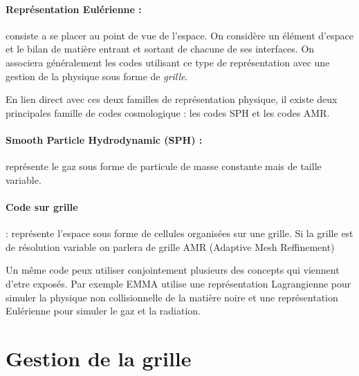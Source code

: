 \paragraph{Représentation Eulérienne : } 
consiste a se placer au point de vue de l'espace.
On considère un élément d'espace et le bilan de matière entrant et sortant de chacune de ses interfaces.
On associera généralement les codes utilisant ce type de représentation avec une gestion de la physique sous forme de \emph{grille}.

En lien direct avec ces deux familles de représentation physique, il existe deux principales famille de codes cosmologique : les codes \ac{SPH} et les codes \ac{AMR}.

\paragraph{Smooth Particle Hydrodynamic (SPH) : } représente le gaz sous forme de particule de masse constante mais de taille variable.

\paragraph{Code sur grille} : représente l'espace sous forme de cellules organisées sur une grille. 
Si la grille est de résolution variable on parlera de grille AMR (Adaptive Mesh Reffinement) 




Un même code peux utiliser conjointement plusieurs des concepts qui viennent d'etre exposés.
Par exemple EMMA utilise une représentation Lagrangienne pour simuler la physique non collisionnelle de la matière noire et une représentation Eulérienne pour simuler le gaz et la radiation.

\section{Gestion de la grille}
\label{sec_gestion_grille}


